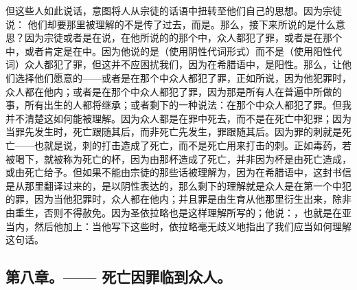 但这些人如此说话，意图将人从宗徒的话语中扭转至他们自己的思想。因为宗徒说： 他们却要那里被理解的不是传了过去，而是。那么，接下来所说的是什么意思？因为宗徒或者是在说，在他所说的的那个中，众人都犯了罪，或者是在那个中，或者肯定是在中。因为他说的是（使用阴性代词形式）而不是（使用阳性代词）众人都犯了罪，但这并不应困扰我们，因为在希腊语中，是阳性。那么，让他们选择他们愿意的——或者是在那个中众人都犯了罪，正如所说，因为他犯罪时，众人都在他内；或者是在那个中众人都犯了罪，因为那是所有人在普遍中所做的事，所有出生的人都将继承；或者剩下的一种说法：在那个中众人都犯了罪。但我并不清楚这如何能被理解。因为众人都是在罪中死去，而不是在死亡中犯罪；因为当罪先发生时，死亡跟随其后，而非死亡先发生，罪跟随其后。因为罪的刺就是死亡——也就是说，刺的打击造成了死亡，而不是死亡用来打击的刺。正如毒药，若被喝下，就被称为死亡的杯，因为由那杯造成了死亡，并非因为杯是由死亡造成，或由死亡给予。但如果不能由宗徒的那些话被理解为，因为在希腊语中，这封书信是从那里翻译过来的，是以阴性表达的，那么剩下的理解就是众人是在第一个中犯的罪，因为当他犯罪时，众人都在他内；并且罪是由生育从他那里衍生出来，除非由重生，否则不得赦免。因为圣依拉略也是这样理解所写的；他说：，也就是在亚当内，然后他加上：当他写下这些时，依拉略毫无歧义地指出了我们应当如何理解这句话。\par


\subsection{第八章。—— 死亡因罪临到众人。}

